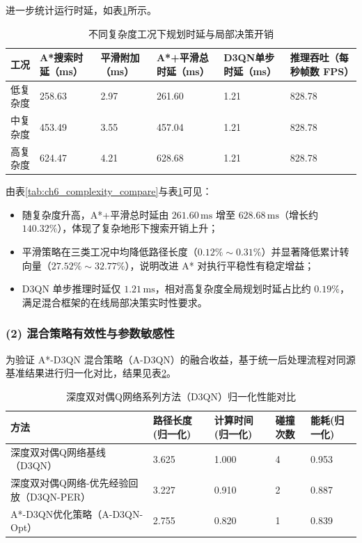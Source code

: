 \documentclass[UTF8,zihao=-4,a4paper,oneside,openany]{ctexrep}
\numberwithin{equation}{chapter}
\renewcommand{\small}{\normalsize}
\renewcommand{\small}{\normalsize}
\theoremstyle{plain}
\theoremstyle{definition}
\newenvironment{myitemize}{\begin{itemize}[noitemsep,topsep=0pt]}{\end{itemize}}
\begin{document}
进一步统计运行时延，如表\ref{tab:ch6_runtime_compare}所示。

\begin{table}[H]
\centering
\small
\caption{不同复杂度工况下规划时延与局部决策开销}
\label{tab:ch6_runtime_compare}
\setlength{\tabcolsep}{3pt}
\begin{tabular}{p{}p{}p{}p{}p{}p{}}
\toprule
工况 & A*搜索时延（ms） & 平滑附加（ms） & A*+平滑总时延（ms） & D3QN单步时延（ms） & 推理吞吐（每秒帧数 FPS） \\
\midrule
低复杂度 & 258.63 & 2.97 & 261.60 & 1.21 & 828.78 \\
中复杂度 & 453.49 & 3.55 & 457.04 & 1.21 & 828.78 \\
高复杂度 & 624.47 & 4.21 & 628.68 & 1.21 & 828.78 \\
\bottomrule
\end{tabular}
\end{table}

由表\ref{tab:ch6_complexity_compare}与表\ref{tab:ch6_runtime_compare}可见：
\begin{myitemize}
\item 随复杂度升高，A*+平滑总时延由 $261.60\,\mathrm{ms}$ 增至 $628.68\,\mathrm{ms}$（增长约 $140.32\%$），体现了复杂地形下搜索开销上升；
\item 平滑策略在三类工况中均降低路径长度（$0.12\%\sim0.31\%$）并显著降低累计转向量（$27.52\%\sim32.77\%$），说明改进 A* 对执行平稳性有稳定增益；
\item D3QN 单步推理时延仅 $1.21\,\mathrm{ms}$，相对高复杂度全局规划时延占比约 $0.19\%$，满足混合框架的在线局部决策实时性要求。
\end{myitemize}

\subsubsection*{(2) 混合策略有效性与参数敏感性}

为验证 A*-D3QN 混合策略（A-D3QN）的融合收益，基于统一后处理流程对同源基准结果进行归一化对比，结果见表\ref{tab:ch6_method_compare_norm}。

\begin{table}[H]
\centering
\small
\caption{深度双对偶Q网络系列方法（D3QN）归一化性能对比}
\label{tab:ch6_method_compare_norm}
\begin{tabular}{p{}p{}p{}p{}p{}}
\toprule
方法 & 路径长度(归一化) & 计算时间(归一化) & 碰撞次数 & 能耗(归一化) \\
\midrule
深度双对偶Q网络基线（D3QN） & 3.625 & 1.000 & 4 & 0.953 \\
深度双对偶Q网络-优先经验回放（D3QN-PER） & 3.227 & 0.910 & 2 & 0.887 \\
A*-D3QN优化策略（A-D3QN-Opt） & 2.755 & 0.820 & 1 & 0.839 \\
\bottomrule
\end{tabular}
\end{table}
\end{document}
